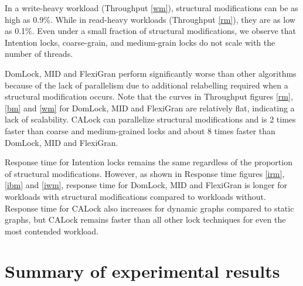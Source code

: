 In a write-heavy workload (Throughput \cref{wm}), structural modifications can be as high as 0.9\%. 
While in read-heavy workloads (Throughput \cref{rm}), they are as low as 0.1\%.
Even under a small fraction of structural modifications, we observe that Intention locks, coarse-grain, and medium-grain locks do not scale with the number of threads. 

DomLock, MID and FlexiGran perform significantly worse than other algorithms because of the lack of parallelism due to additional relabelling required when a structural modification occurs.
Note that the curves in Throughput figures \cref{rm}, \cref{bm} and \cref{wm} for DomLock, MID and FlexiGran are relatively flat, indicating a lack of scalability. CALock can parallelize structural modifications and is 2 times faster than coarse and medium-grained locks and about 8 times faster than DomLock, MID and FlexiGran.

Response time for Intention locks remains the same regardless of the proportion of structural modifications. However, as shown in Response time figures \cref{irm}, \cref{ibm} and \cref{iwm}, response time for DomLock, MID and FlexiGran is longer for workloads with structural modifications compared to workloads without.
Response time for CALock also increases for dynamic graphs compared to static graphs, but CALock remains faster than all other lock techniques for even the most contended workload.


\section{Summary of experimental results}



